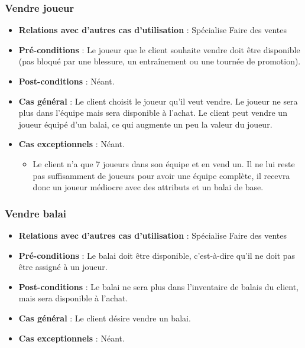 \documentclass[a4paper,titlepage]{scrreprt}
\begin{document}
    \subsubsection{Vendre joueur}
      \begin{itemize}
        \item \textbf{Relations avec d'autres cas d'utilisation}  : Spécialise Faire des ventes
        \item \textbf{Pré-conditions} : Le joueur que le client souhaite vendre doit être disponible (pas bloqué par une blessure, un entraînement ou une tournée de promotion).
        \item \textbf{Post-conditions} : Néant.
        \item \textbf{Cas général} : Le client choisit le joueur qu’il veut vendre. Le joueur ne sera plus dans l’équipe mais sera disponible à l’achat. Le client peut vendre un joueur équipé d’un balai, ce qui augmente un peu la valeur du joueur.
        \item \textbf{Cas exceptionnels} : Néant.
          \begin{itemize}
            \item Le client n’a que 7 joueurs dans son équipe et en vend un. Il ne lui reste pas suffisamment de joueurs pour avoir une équipe complète, il recevra donc un joueur médiocre avec des attributs et un balai de base.
          \end{itemize}
      \end{itemize}
    \subsubsection{Vendre balai}
      \begin{itemize}
        \item \textbf{Relations avec d'autres cas d'utilisation}  : Spécialise Faire des ventes
        \item \textbf{Pré-conditions} : Le balai doit être disponible, c’est-à-dire qu’il ne doit pas être assigné à un joueur.
        \item \textbf{Post-conditions} : Le balai ne sera plus dans l’inventaire de balais du client, mais sera disponible à l’achat.
        \item \textbf{Cas général} : Le client désire vendre un balai.
        \item \textbf{Cas exceptionnels} : Néant.
      \end{itemize}
\end{document}
